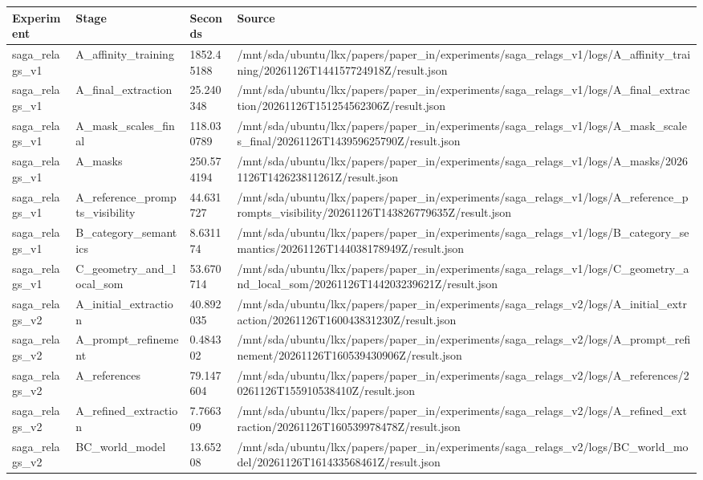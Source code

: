 \begin{tabular}{llll}
\hline
Experiment & Stage & Seconds & Source \\
\hline
saga\_relags\_v1 & A\_affinity\_training & 1852.45188 & /mnt/sda/ubuntu/lkx/papers/paper\_in/experiments/saga\_relags\_v1/logs/A\_affinity\_training/20261126T144157724918Z/result.json \\
saga\_relags\_v1 & A\_final\_extraction & 25.240348 & /mnt/sda/ubuntu/lkx/papers/paper\_in/experiments/saga\_relags\_v1/logs/A\_final\_extraction/20261126T151254562306Z/result.json \\
saga\_relags\_v1 & A\_mask\_scales\_final & 118.030789 & /mnt/sda/ubuntu/lkx/papers/paper\_in/experiments/saga\_relags\_v1/logs/A\_mask\_scales\_final/20261126T143959625790Z/result.json \\
saga\_relags\_v1 & A\_masks & 250.574194 & /mnt/sda/ubuntu/lkx/papers/paper\_in/experiments/saga\_relags\_v1/logs/A\_masks/20261126T142623811261Z/result.json \\
saga\_relags\_v1 & A\_reference\_prompts\_visibility & 44.631727 & /mnt/sda/ubuntu/lkx/papers/paper\_in/experiments/saga\_relags\_v1/logs/A\_reference\_prompts\_visibility/20261126T143826779635Z/result.json \\
saga\_relags\_v1 & B\_category\_semantics & 8.631174 & /mnt/sda/ubuntu/lkx/papers/paper\_in/experiments/saga\_relags\_v1/logs/B\_category\_semantics/20261126T144038178949Z/result.json \\
saga\_relags\_v1 & C\_geometry\_and\_local\_som & 53.670714 & /mnt/sda/ubuntu/lkx/papers/paper\_in/experiments/saga\_relags\_v1/logs/C\_geometry\_and\_local\_som/20261126T144203239621Z/result.json \\
saga\_relags\_v2 & A\_initial\_extraction & 40.892035 & /mnt/sda/ubuntu/lkx/papers/paper\_in/experiments/saga\_relags\_v2/logs/A\_initial\_extraction/20261126T160043831230Z/result.json \\
saga\_relags\_v2 & A\_prompt\_refinement & 0.484302 & /mnt/sda/ubuntu/lkx/papers/paper\_in/experiments/saga\_relags\_v2/logs/A\_prompt\_refinement/20261126T160539430906Z/result.json \\
saga\_relags\_v2 & A\_references & 79.147604 & /mnt/sda/ubuntu/lkx/papers/paper\_in/experiments/saga\_relags\_v2/logs/A\_references/20261126T155910538410Z/result.json \\
saga\_relags\_v2 & A\_refined\_extraction & 7.766309 & /mnt/sda/ubuntu/lkx/papers/paper\_in/experiments/saga\_relags\_v2/logs/A\_refined\_extraction/20261126T160539978478Z/result.json \\
saga\_relags\_v2 & BC\_world\_model & 13.65208 & /mnt/sda/ubuntu/lkx/papers/paper\_in/experiments/saga\_relags\_v2/logs/BC\_world\_model/20261126T161433568461Z/result.json \\
\hline
\end{tabular}
